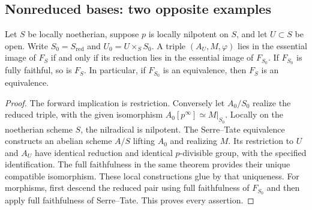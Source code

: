 \subsection{Nonreduced bases: two opposite examples}

\begin{proposition}\label{prop:C-RD3}
Let $S$ be locally noetherian, suppose $p$ is locally nilpotent on $S$, and
let $U\subset S$ be open. Write $S_0=S_{\mathrm{red}}$ and
$U_0=U\times_SS_0$. A triple $(A_U,M,\varphi)$ lies in the essential image
of $F_S$ if and only if its reduction lies in the essential image of
$F_{S_0}$. If $F_{S_0}$ is fully faithful, so is $F_S$. In particular,
if $F_{S_0}$ is an equivalence, then $F_S$ is an equivalence.
\end{proposition}
\begin{proof}
The forward implication is restriction. Conversely let $A_0/S_0$
realize the reduced triple, with the given isomorphism
$A_0[p^\infty]\simeq M|_{S_0}$. Locally on the noetherian scheme $S$,
the nilradical is nilpotent. The Serre--Tate equivalence
\cite[Theorem~1.2.1]{Katz1981SerreTate} constructs an abelian scheme
$A/S$ lifting $A_0$ and realizing $M$. Its restriction to $U$ and $A_U$
have identical reduction and identical $p$-divisible group, with the
specified identification. The full faithfulness in the same theorem
provides their unique compatible isomorphism. These local constructions
glue by that uniqueness. For morphisms, first descend the reduced pair
using full faithfulness of $F_{S_0}$ and then apply full faithfulness of
Serre--Tate. This proves every assertion.
\end{proof}

